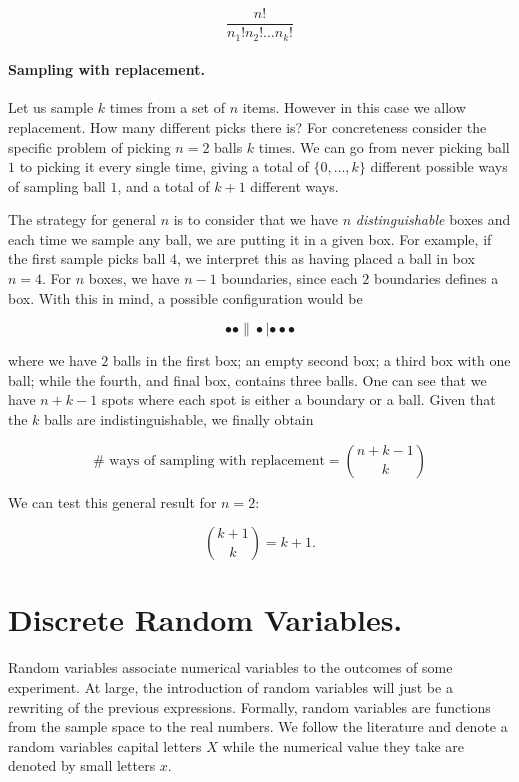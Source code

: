 \documentclass[12pt]{article}
\begin{document}
\begin{equation}
\frac{n!}{n_{1} ! n_{2} ! \ldots n_{k}!}
\end{equation}

\paragraph{Sampling with replacement.}
Let us sample $k$ times from a set of $n$ items. However in this
case we allow replacement. How many different picks there is?
For concreteness consider the specific problem of picking $n = 2$ balls $k$ times. 
We can go from never picking ball $1$ to picking it every single time,
giving a total of $\{0, \ldots, k\}$ different possible ways of sampling ball $1$, 
and a total of  $k + 1$ different ways.

The strategy for general $n$ is to consider that we have $n$ \textit{distinguishable}
boxes and each time we sample any ball, we are putting it in a given box.
For example, if the first sample picks ball $4$, we interpret this as
having placed a ball in box $n = 4$.
For $n$ boxes, we have $n-1$ boundaries, since each $2$ boundaries
defines a box. With this in mind, a possible configuration would be

\begin{equation}
\bullet \bullet \| \bullet | \bullet \bullet \bullet
\end{equation}

\noindent
where we have $2$ balls in the first box; an empty second box; a third box with
one ball; while the fourth, and final box, contains three balls.
One can see that we have $n + k -1$ spots where each spot is either a boundary or a 
ball. Given that the $k$ balls are indistinguishable, we finally obtain

\begin{equation}
\# \mbox{ ways of sampling with replacement} =
{ n + k - 1 \choose k }
\end{equation}

\noindent
We can test this general result for $n=2$:

\begin{equation}
{ k + 1 \choose k } = k + 1.
\end{equation}

\section{Discrete Random Variables.}

Random variables associate numerical variables to the outcomes of some experiment.	
At large, the introduction of random variables will just be a rewriting of the previous 
expressions.
Formally, random variables are functions from the sample space to the real numbers.
We follow the literature and denote a random variables capital letters $X$ while the 
numerical value they take are denoted by small letters $x$.
\end{document}

